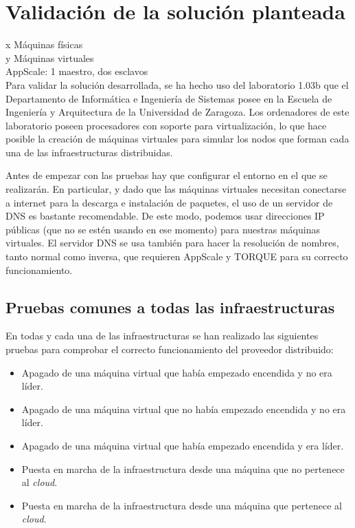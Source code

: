 \chapter{Validación de la solución planteada}
\label{cap:validacion}

x Máquinas físicas\\
y Máquinas virtuales\\
AppScale: 1 maestro, dos esclavos\\


Para validar la solución desarrollada, se ha hecho uso del laboratorio 1.03b que el Departamento de Informática e Ingeniería de Sistemas posee en la Escuela de Ingeniería y Arquitectura de la Universidad de Zaragoza. Los ordenadores de este laboratorio poseen procesadores con soporte para virtualización, lo que hace posible la creación de máquinas virtuales para simular los nodos que forman cada una de las infraestructuras distribuidas.

Antes de empezar con las pruebas hay que configurar el entorno en el que se realizarán. En particular, y dado que las máquinas virtuales necesitan conectarse a internet para la descarga e instalación de paquetes, el uso de un servidor de DNS es bastante recomendable. De este modo, podemos usar direcciones IP públicas (que no se estén usando en ese momento) para nuestras máquinas virtuales. El servidor DNS se usa también para hacer la resolución de nombres, tanto normal como inversa, que requieren AppScale y TORQUE para su correcto funcionamiento.


\section{Pruebas comunes a todas las infraestructuras}

En todas y cada una de las infraestructuras se han realizado las siguientes pruebas para comprobar el correcto funcionamiento del proveedor distribuido:

\begin{itemize}
\item Apagado de una máquina virtual que había empezado encendida y no era líder.
\item Apagado de una máquina virtual que no había empezado encendida y no era líder.
\item Apagado de una máquina virtual que había empezado encendida y era líder.
\item Puesta en marcha de la infraestructura desde una máquina que no pertenece al \emph{cloud}.
\item Puesta en marcha de la infraestructura desde una máquina que pertenece al \emph{cloud}.
\end{itemize}


